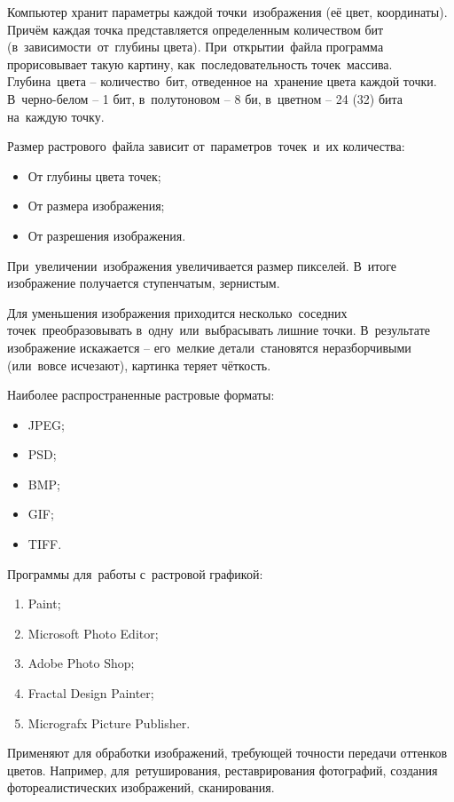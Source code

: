 \documentclass{ou}
\begin{document}
Компьютер хранит параметры каждой точки~изображения (её цвет, координаты). Причём каждая точка представляется определенным количеством бит (в~зависимости~от~глубины цвета). При~открытии~файла программа прорисовывает такую картину, как~последовательность точек~массива. Глубина~цвета -- количество~бит, отведенное на~хранение цвета каждой точки. В~черно-белом -- 1 бит, в~полутоновом -- 8 би, в~цветном -- 24 (32) бита на~каждую точку.

Размер растрового~файла зависит от~параметров~точек~и~их количества:
\begin{itemize}[label=-, leftmargin=0em, itemindent=3.35em, nosep]
\item От глубины цвета точек;
\item От размера изображения;
\item От разрешения изображения.
\end{itemize}

При~увеличении~изображения увеличивается размер пикселей. В~итоге изображение получается ступенчатым, зернистым.
 
Для уменьшения изображения приходится несколько~соседних точек~преобразовывать в~одну~или~выбрасывать лишние точки. В~результате изображение искажается -- его~мелкие детали~становятся неразборчивыми (или~вовсе исчезают), картинка теряет чёткость. 

Наиболее распространенные растровые форматы: 
\begin{itemize}[label=-, leftmargin=0em, itemindent=3.35em, nosep]
\item JPEG;
\item PSD;
\item BMP;
\item GIF;
\item TIFF.
\end{itemize}

Программы для~работы с~растровой графикой:
\begin{enumerate}[leftmargin=0em, itemindent=3.75em, nosep, label=\arabic*)]
\item Paint;
\item Microsoft Photo Editor;
\item Adobe Photo Shop;
\item Fractal Design Painter;
\item Micrografx Picture Publisher.
\end{enumerate}

Применяют для обработки изображений, требующей точности передачи оттенков цветов.  Например, для~ретуширования, реставрирования фотографий, создания фотореалистических изображений, сканирования.
\end{document}
